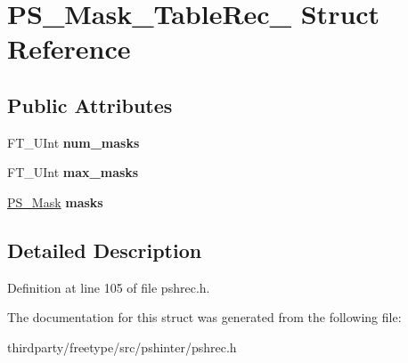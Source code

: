 \hypertarget{struct_p_s___mask___table_rec__}{}\section{P\+S\+\_\+\+Mask\+\_\+\+Table\+Rec\+\_\+ Struct Reference}
\label{struct_p_s___mask___table_rec__}
\subsection*{Public Attributes}
\begin{DoxyCompactItemize}
\item 
\mbox{\label{struct_p_s___mask___table_rec___a361f81947db638b79253b98f6ceb63b6}} 
F\+T\+\_\+\+U\+Int {\bfseries num\+\_\+masks}
\item 
\mbox{\label{struct_p_s___mask___table_rec___a837b778444df6b1a316d781668db3f32}} 
F\+T\+\_\+\+U\+Int {\bfseries max\+\_\+masks}
\item 
\mbox{\label{struct_p_s___mask___table_rec___a20d596cfc59134e06fca6c1b0a030fb8}} 
\hyperlink{struct_p_s___mask_rec__}{P\+S\+\_\+\+Mask} {\bfseries masks}
\end{DoxyCompactItemize}


\subsection{Detailed Description}


Definition at line 105 of file pshrec.\+h.



The documentation for this struct was generated from the following file\+:\begin{DoxyCompactItemize}
\item 
thirdparty/freetype/src/pshinter/pshrec.\+h\end{DoxyCompactItemize}
